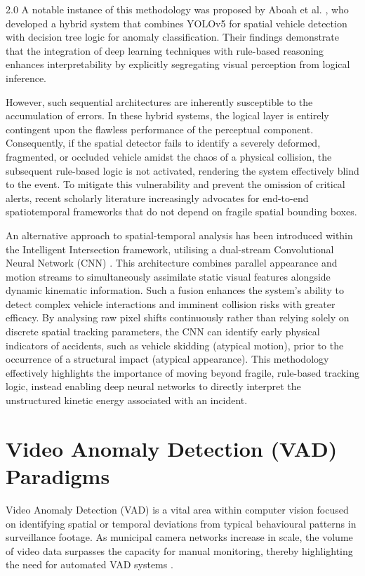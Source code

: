 \begin{spacing}{2.0}
A notable instance of this methodology was proposed by Aboah et al. \cite{aboah_vision-based_2021}, who developed a hybrid system that combines YOLOv5 for spatial vehicle detection with decision tree logic for anomaly classification. Their findings demonstrate that the integration of deep learning techniques with rule-based reasoning enhances interpretability by explicitly segregating visual perception from logical inference.

However, such sequential architectures are inherently susceptible to the accumulation of errors. In these hybrid systems, the logical layer is entirely contingent upon the flawless performance of the perceptual component. Consequently, if the spatial detector fails to identify a severely deformed, fragmented, or occluded vehicle amidst the chaos of a physical collision, the subsequent rule-based logic is not activated, rendering the system effectively blind to the event. To mitigate this vulnerability and prevent the omission of critical alerts, recent scholarly literature increasingly advocates for end-to-end spatiotemporal frameworks that do not depend on fragile spatial bounding boxes.

An alternative approach to spatial-temporal analysis has been introduced within the Intelligent Intersection framework, utilising a dual-stream Convolutional Neural Network (CNN) \cite{huang_intelligent_2019}. This architecture combines parallel appearance and motion streams to simultaneously assimilate static visual features alongside dynamic kinematic information. Such a fusion enhances the system’s ability to detect complex vehicle interactions and imminent collision risks with greater efficacy. By analysing raw pixel shifts continuously rather than relying solely on discrete spatial tracking parameters, the CNN can identify early physical indicators of accidents, such as vehicle skidding (atypical motion), prior to the occurrence of a structural impact (atypical appearance). This methodology effectively highlights the importance of moving beyond fragile, rule-based tracking logic, instead enabling deep neural networks to directly interpret the unstructured kinetic energy associated with an incident.

\section{Video Anomaly Detection (VAD) Paradigms}
Video Anomaly Detection (VAD) is a vital area within computer vision focused on identifying spatial or temporal deviations from typical behavioural patterns in surveillance footage. As municipal camera networks increase in scale, the volume of video data surpasses the capacity for manual monitoring, thereby highlighting the need for automated VAD systems \cite{hasan_learning_2016}.


\end{spacing}
